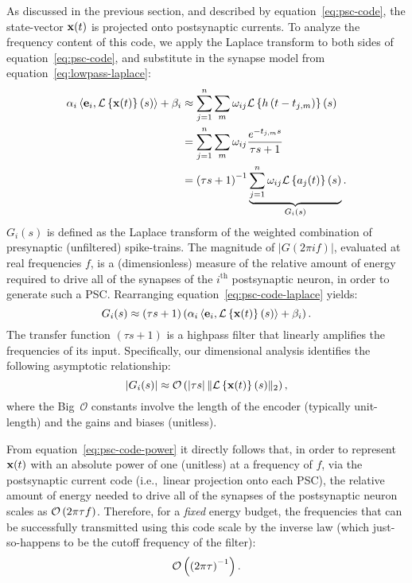 As discussed in the previous section, and described by equation~\ref{eq:psc-code}, the state-vector $\mathbf{x}(t)$ is projected onto postsynaptic currents.
To analyze the frequency content of this code, we apply the Laplace transform to both sides of equation~\ref{eq:psc-code}, and substitute in the synapse model from equation~\ref{eq:lowpass-laplace}:
\begin{equation} \label{eq:psc-code-laplace}
\begin{aligned}
\alpha_i \left\langle \mathbf{e}_i\text{,}\, \mathcal{L}\left\{{ \mathbf{x}(t) }\right\}(s) \right\rangle + \beta_i &\approx \sum_{j=1}^n \sum_m \omega_{ij} \mathcal{L}\left\{{ h \left( t - t_{j\text{,}m} \right) }\right\}(s) \\
&= \sum_{j=1}^n \sum_m \omega_{ij} \frac{e^{-{t_{j\text{,}m}s}}}{\tau s + 1} \\ 
&= \left( \tau s + 1 \right)^{-1} \underbrace{ \sum_{j=1}^n \omega_{ij} \mathcal{L}\left\{{ a_j(t) }\right\}(s) }_{G_i(s)} \text{.}
\end{aligned}
\end{equation}
$G_i(s)$ is defined as the Laplace transform of the weighted combination of presynaptic (unfiltered) spike-trains.
The magnitude of $| G(2\pi i f) |$, evaluated at real frequencies $f$, is a (dimensionless) measure of the relative amount of energy required to drive all of the synapses of the $i^\text{th}$ postsynaptic neuron, in order to generate such a PSC.
Rearranging equation~\ref{eq:psc-code-laplace} yields:
\begin{equation} \label{eq:psc-code-rearranged}
G_i(s) \approx \left( \tau s + 1 \right) \left( \alpha_i \left\langle \mathbf{e}_i\text{,}\, \mathcal{L}\left\{{ \mathbf{x}(t) }\right\}(s) \right\rangle + \beta_i \right) \text{.}
\end{equation}
The transfer function $\left( \tau s + 1 \right)$ is a highpass filter that linearly amplifies the frequencies of its input.
Specifically, our dimensional analysis identifies the following asymptotic relationship:
\begin{equation} \label{eq:psc-code-power}
| G_i(s) | \approx \mathcal{O}\left({ \left| \tau s \right| \| \mathcal{L}\left\{{ \mathbf{x}(t) }\right\}(s) \|_2 }\right) \text{,}
\end{equation}
where the Big~$\mathcal{O}$ constants involve the length of the encoder (typically unit-length) and the gains and biases (unitless).

From equation~\ref{eq:psc-code-power} it directly follows that, in order to represent $\mathbf{x}(t)$ with an absolute power of one (unitless) at a frequency of $f$, via the postsynaptic current code (i.e.,~linear projection onto each PSC), the relative amount of energy needed to drive all of the synapses of the postsynaptic neuron scales as $\mathcal{O}\left({2 \pi \tau f }\right)$.
Therefore, for a \emph{fixed} energy budget, the frequencies that can be successfully transmitted using this code scale by the inverse law (which just-so-happens to be the cutoff frequency of the filter):
\begin{equation} \label{eq:low-frequency-representation}
\mathcal{O}\left({\left( 2 \pi \tau \right)^{-1}}\right) \text{.}
\end{equation}

